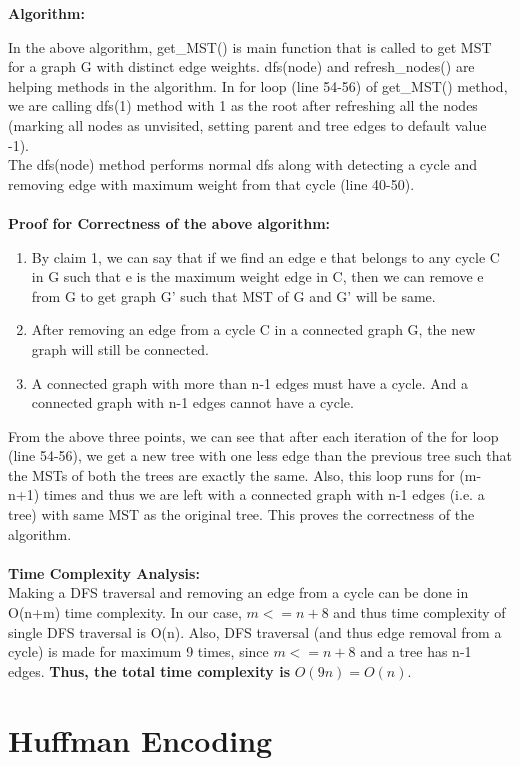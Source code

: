 \documentclass{article}
\begin{document}
\textbf{Algorithm:}

In the above algorithm, get\_MST() is main function that is called to get MST for a graph G with distinct edge weights. dfs(node) and refresh\_nodes() are helping methods in the algorithm. In for loop (line 54-56) of get\_MST() method, we are calling dfs(1) method with 1 as the root after refreshing all the nodes (marking all nodes as unvisited, setting parent and tree edges to default value -1).\\
The dfs(node) method performs normal dfs along with detecting a cycle and removing edge with maximum weight from that cycle (line 40-50).
\\
\\
\textbf{Proof for Correctness of the above algorithm:}

\begin{enumerate}
\item By claim 1, we can say that if we find an edge e that belongs to any cycle C in G such that e is the maximum weight edge in C, then we can remove e from G to get graph G' such that MST of G and G' will be same.
\item After removing an edge from a cycle C in a connected graph G, the new graph will still be connected.
\item A connected graph with more than n-1 edges must have a cycle. And a connected graph with n-1 edges cannot have a cycle.
\end{enumerate}

From the above three points, we can see that after each iteration of the for loop (line 54-56), we get a new tree with one less edge than the previous tree such that the MSTs of both the trees are exactly the same. Also, this loop runs for (m-n+1) times and thus we are left with a connected graph with n-1 edges (i.e. a tree) with same MST as the original tree. This proves the correctness of the algorithm.
\\\\
\textbf{Time Complexity Analysis:}
\\Making a DFS traversal and removing an edge from a cycle can be done in O(n+m) time complexity. In our case, $m<=n+8$ and thus time complexity of single DFS traversal is O(n). Also, DFS traversal (and thus edge removal from a cycle) is made for maximum 9 times, since $m<=n+8$ and a tree has n-1 edges. \textbf{Thus, the total time complexity is} $O(9n) = O(n)$. 

\newpage
\section{Huffman Encoding}
\end{document}
